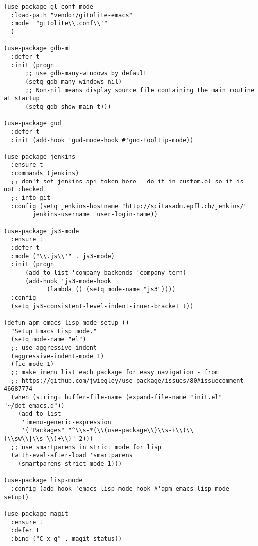 \documentclass[11pt]{article}
\begin{document}
\begin{verbatim}
(use-package gl-conf-mode
  :load-path "vendor/gitolite-emacs"
  :mode  "gitolite\\.conf\\'"
  )

(use-package gdb-mi
  :defer t
  :init (progn
	  ;; use gdb-many-windows by default
	  (setq gdb-many-windows nil)
	  ;; Non-nil means display source file containing the main routine at startup
	  (setq gdb-show-main t)))

(use-package gud
  :defer t
  :init (add-hook 'gud-mode-hook #'gud-tooltip-mode))

(use-package jenkins
  :ensure t
  :commands (jenkins)
  ;; don't set jenkins-api-token here - do it in custom.el so it is not checked
  ;; into git
  :config (setq jenkins-hostname "http://scitasadm.epfl.ch/jenkins/"
		jenkins-username 'user-login-name))

(use-package js3-mode
  :ensure t
  :defer t
  :mode ("\\.js\\'" . js3-mode)
  :init (progn
	  (add-to-list 'company-backends 'company-tern)
	  (add-hook 'js3-mode-hook
		    (lambda () (setq mode-name "js3"))))
  :config
  (setq js3-consistent-level-indent-inner-bracket t))

(defun apm-emacs-lisp-mode-setup ()
  "Setup Emacs Lisp mode."
  (setq mode-name "el")
  ;; use aggressive indent
  (aggressive-indent-mode 1)
  (fic-mode 1)
  ;; make imenu list each package for easy navigation - from
  ;; https://github.com/jwiegley/use-package/issues/80#issuecomment-46687774
  (when (string= buffer-file-name (expand-file-name "init.el" "~/dot_emacs.d"))
    (add-to-list
     'imenu-generic-expression
     '("Packages" "^\\s-*(\\(use-package\\)\\s-+\\(\\(\\sw\\|\\s_\\)+\\)" 2)))
  ;; use smartparens in strict mode for lisp
  (with-eval-after-load 'smartparens
    (smartparens-strict-mode 1)))

(use-package lisp-mode
  :config (add-hook 'emacs-lisp-mode-hook #'apm-emacs-lisp-mode-setup))

(use-package magit
  :ensure t
  :defer t
  :bind ("C-x g" . magit-status))


\end{verbatim}
\end{document}
